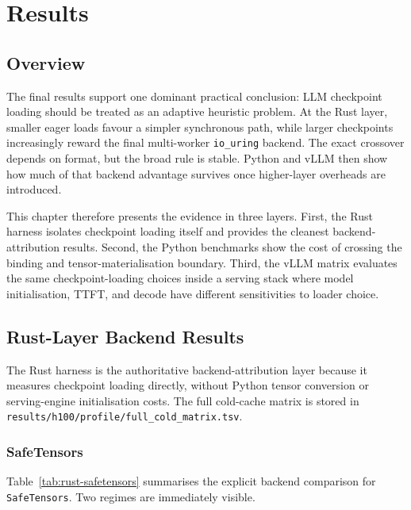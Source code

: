 \chapter{Results}
\label{chap:results}

\section{Overview}

The final results support one dominant practical conclusion: LLM checkpoint loading should be treated as an adaptive heuristic problem. At the Rust layer, smaller eager loads favour a simpler synchronous path, while larger checkpoints increasingly reward the final multi-worker \texttt{io\_uring} backend. The exact crossover depends on format, but the broad rule is stable. Python and vLLM then show how much of that backend advantage survives once higher-layer overheads are introduced.

This chapter therefore presents the evidence in three layers. First, the Rust harness isolates checkpoint loading itself and provides the cleanest backend-attribution results. Second, the Python benchmarks show the cost of crossing the binding and tensor-materialisation boundary. Third, the vLLM matrix evaluates the same checkpoint-loading choices inside a serving stack where model initialisation, TTFT, and decode have different sensitivities to loader choice.

\section{Rust-Layer Backend Results}

The Rust harness is the authoritative backend-attribution layer because it measures checkpoint loading directly, without Python tensor conversion or serving-engine initialisation costs. The full cold-cache matrix is stored in \texttt{results/h100/profile/full\_cold\_matrix.tsv}.

\subsection{SafeTensors}

Table~\ref{tab:rust-safetensors} summarises the explicit backend comparison for \texttt{SafeTensors}. Two regimes are immediately visible.

